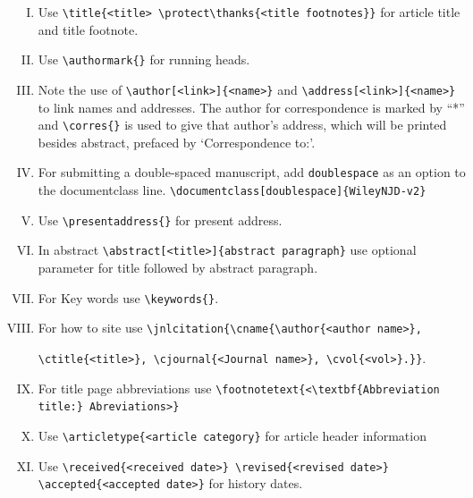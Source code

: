 \documentclass[AMA,STIX1COL]{WileyNJD-v2}
\begin{document}
\begin{enumerate}[(I).]

\item Use \verb"\title{<title> \protect\thanks{<title footnotes}}" for article title and title footnote.
\item Use \verb"\authormark{}" for running heads.

\item Note the use of \verb"\author[<link>]{<name>}" and \verb"\address[<link>]{<name>}" to
link names and addresses. The author for correspondence is marked
by ``*'' and \verb"\corres{}" is used to give that
author's address, which will be printed besides abstract, prefaced by
`Correspondence to:'.

\item For submitting a double-spaced manuscript, add
\verb"doublespace" as an option to the documentclass line. \verb"\documentclass[doublespace]{WileyNJD-v2}"

\item Use \verb"\presentaddress{}" for present address.

\item In abstract \verb"\abstract[<title>]{abstract paragraph}" use optional parameter for title followed by abstract paragraph.

\item For Key words use \verb"\keywords{}".

\item For how to site use \verb"\jnlcitation{\cname{\author{<author name>},"

\verb"\ctitle{<title>}, \cjournal{<Journal name>}, \cvol{<vol>}.}}".

\item For title page abbreviations use \verb"\footnotetext{<\textbf{Abbreviation title:} Abreviations>}"

\item Use \verb"\articletype{<article category}" for article header information

\item Use \verb"\received{<received date>} \revised{<revised date>} \accepted{<accepted date>}" for history dates.

\end{enumerate}
\end{document}
